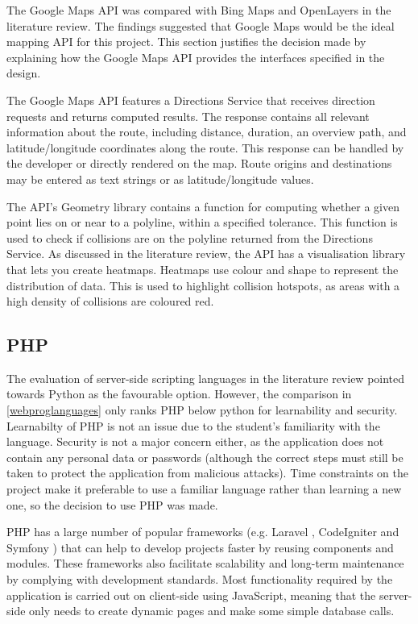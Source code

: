 \documentclass[authoryearcitations]{UoYCSproject}
\begin{document}
The Google Maps API \citep{Google} was compared with Bing Maps and OpenLayers in the literature review. The findings suggested that Google Maps would be the ideal mapping API for this project. This section justifies the decision made by explaining how the Google Maps API provides the interfaces specified in the design.

The Google Maps API features a Directions Service that receives direction requests and returns computed results. The response contains all relevant information about the route, including distance, duration, an overview path, and latitude/longitude coordinates along the route. This response can be handled by the developer or directly rendered on the map. Route origins and destinations may be entered as text strings or as latitude/longitude values. 

The API's Geometry library contains a function for computing whether a given point lies on or near to a polyline, within a specified tolerance. This function is used to check if collisions are on the polyline returned from the Directions Service. As discussed in the literature review, the API has a visualisation library that lets you create heatmaps. Heatmaps use colour and shape to represent the distribution of data. This is used to highlight collision hotspots, as areas with a high density of collisions are coloured red.

\subsection{PHP}

The evaluation of server-side scripting languages in the literature review pointed towards Python as the favourable option. However, the comparison in \autoref{webproglanguages} only ranks PHP below python for learnability and security. Learnabilty of PHP is not an issue due to the student's familiarity with the language. Security is not a major concern either, as the application does not contain any personal data or passwords (although the correct steps must still be taken to protect the application from malicious attacks). Time constraints on the project make it preferable to use a familiar language rather than learning a new one, so the decision to use PHP was made.

PHP has a large number of popular frameworks (e.g. Laravel \citep{Laravel}, CodeIgniter \citep{codeIgniter} and Symfony \citep{SensioLabs}) that can help to develop projects faster by reusing components and modules. These frameworks also facilitate scalability and long-term maintenance by complying with development standards. Most functionality required by the application is carried out on client-side using JavaScript, meaning that the server-side only needs to create dynamic pages and make some simple database calls. 
\end{document}
